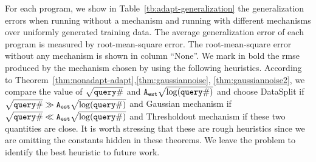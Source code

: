 For each program, we show in Table~\ref{tb:adapt-generalization} the
generalization errors when running without a mechanism and running
with different mechanisms over uniformly generated training data.  The
average generalization error of each program is measured by
root-mean-square error.  The root-mean-square error without any
mechanism is shown in column ``None''. 
We mark in bold the rmse
produced by the mechanism chosen by {\THESYSTEM} using the following
heuristics.  According to Theorem~\ref{thm:nonadapt-adapt},\ref{thm:gaussiannoise},
\ref{thm:gaussiannoise2},
we compare the value of $\sqrt{{\tt query} \#}$ and
${\mathtt{A_{est}}}\sqrt{\log({\tt query} \#)}$ and choose DataSplit if
$\sqrt{{\tt query} \#} \gg {\ensuremath{\mathtt{A_{est}}}}\sqrt{\log({\tt query} \#)}$ and Gaussian
mechanism if $\sqrt{{\tt query} \#} \ll {\ensuremath{\mathtt{A_{est}}}}\sqrt{\log({\tt query} \#)}$ and
Thresholdout mechanism if these two quantities are close. 
 It is worth
stressing that these are rough heuristics since we are omitting the
constants hidden in these theorems. We leave the problem to identify
the best heuristic to future work.




